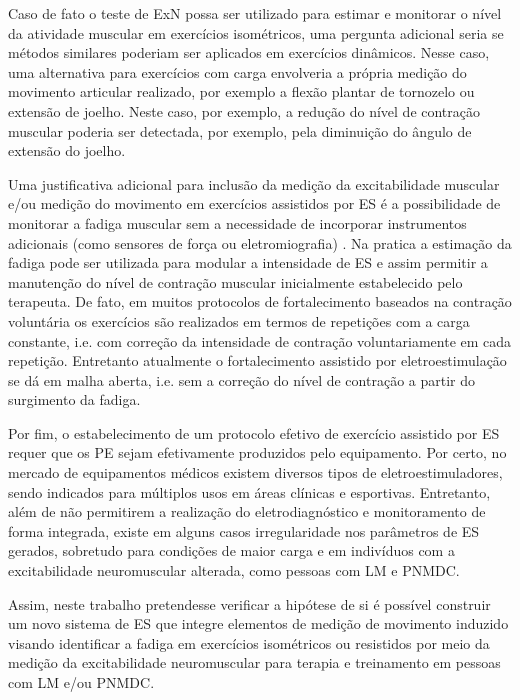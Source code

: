 Caso de fato o teste de \acrshort{ExN} possa ser utilizado para estimar e monitorar o nível da atividade muscular em exercícios isométricos, uma pergunta adicional seria se métodos similares poderiam ser aplicados em exercícios dinâmicos. Nesse caso, uma alternativa para exercícios com carga envolveria a própria medição do movimento articular realizado, por exemplo a flexão plantar de tornozelo ou extensão de joelho. Neste caso, por exemplo, a redução do nível de contração muscular poderia ser detectada, por exemplo, pela diminuição do ângulo de extensão do joelho.

Uma justificativa adicional para inclusão da medição da excitabilidade muscular e/ou medição do movimento em exercícios assistidos por \acrshort{ES} é a possibilidade de monitorar a fadiga muscular sem a necessidade de incorporar instrumentos adicionais (como sensores de força ou eletromiografia) \cite{Vollestad1997MeasurementFatigue}. Na pratica a estimação da fadiga pode ser utilizada para modular a intensidade de ES e assim permitir a manutenção do nível de contração muscular inicialmente estabelecido pelo terapeuta. De fato, em muitos protocolos de fortalecimento baseados na contração voluntária os exercícios são realizados em termos de repetições com a carga constante, i.e. com correção da intensidade de contração voluntariamente em cada repetição. Entretanto atualmente o fortalecimento assistido por eletroestimulação se dá em malha aberta, i.e. sem a correção do nível de contração a partir do surgimento da fadiga.

Por fim, o estabelecimento de um protocolo efetivo de exercício assistido por \acrshort{ES} requer que os \acrshort{PE} sejam efetivamente produzidos pelo equipamento. Por certo, no mercado de equipamentos médicos existem diversos tipos de eletroestimuladores, sendo indicados para múltiplos usos em áreas clínicas e esportivas. Entretanto, além de não permitirem a realização do eletrodiagnóstico e monitoramento de forma integrada, existe em alguns casos irregularidade nos parâmetros de ES gerados, sobretudo para condições de maior carga e em indivíduos com a excitabilidade neuromuscular alterada, como pessoas com \acrshort{LM} e \acrshort{PNMDC}. 

Assim, neste trabalho pretendesse verificar a hipótese de si é possível construir um novo sistema de \acrshort{ES} que integre elementos de medição de movimento induzido visando identificar a fadiga em exercícios isométricos ou resistidos por meio da medição da excitabilidade neuromuscular para terapia e treinamento em pessoas com \acrshort{LM} e/ou \acrshort{PNMDC}.

